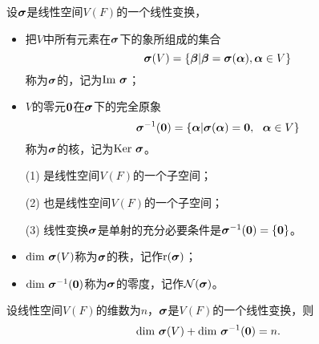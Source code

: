 \begin{frame}
  \begin{dingyi}
    设$\boldsymbol{\sigma}$是线性空间$V(F)$的一个线性变换，
    \begin{itemize}
      \item 把$V$中所有元素在$\boldsymbol{\sigma}$下的象所组成的集合
        $$
        \boldsymbol{\sigma}(V)=\{\boldsymbol{\beta}|\boldsymbol{\beta}=\boldsymbol{\sigma}(\boldsymbol{\alpha}), \boldsymbol{\alpha}\in V\}
        $$
        称为$\boldsymbol{\sigma}$的，记为$\mathrm{Im~}\boldsymbol{\sigma}$；
      \item
        $V$的零元$\M0$在$\boldsymbol{\sigma}$下的完全原象
        $$
        \sigmabd^{-1}(\M0)=\{\alphabd|\sigmabd(\alphabd)=\M0, ~~\alphabd \in V\}
        $$
        称为$\boldsymbol{\sigma}$的核，记为$\mathrm{Ker~}\boldsymbol{\sigma}$。
      \end{itemize}
  \end{dingyi}
\end{frame}



\begin{frame}
  \begin{itemize}
  \item[(1)] 是线性空间$V(F)$的一个子空间； \\[.1in]
  \item[(2)] 也是线性空间$V(F)$的一个子空间；\\[.1in]   
  \item[(3)] 线性变换$\boldsymbol{\sigma}$是单射的充分必要条件是$\sigmabd^{-1}(\M0) = \{\M0\}$。   
  \end{itemize}
\end{frame}


\begin{frame}
  \begin{itemize}
    \item $\mathrm{dim~} \boldsymbol{\sigma}(V)$称为$\boldsymbol{\sigma}$的秩，记作$\mathrm{r}(\boldsymbol{\sigma})$；\\[.15in]
    \item $\dim \sigmabd^{-1}(\M0)$称为$\boldsymbol{\sigma}$的零度，记作$\mathcal N(\boldsymbol{\sigma})$。
    \end{itemize}
\end{frame}

\begin{frame}
  \begin{dingli}
    设线性空间$V(F)$的维数为$n$，$\boldsymbol{\sigma}$是$V(F)$的一个线性变换，则
    $$
    \dim \sigmabd(V)+\dim \sigmabd^{-1}(\M0)=n.
    $$
  \end{dingli}
\end{frame}

